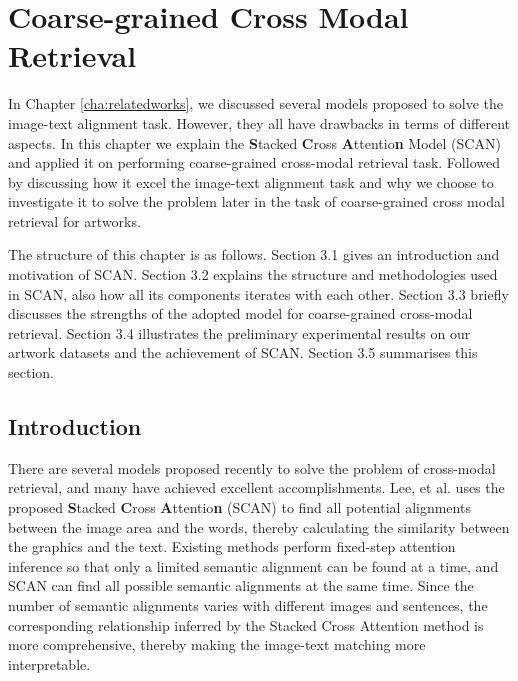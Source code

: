 \chapter{Coarse-grained Cross Modal Retrieval}
\label{cha:scan}
In Chapter \ref{cha:relatedworks}, we discussed several models proposed to solve the image-text alignment task. However, they all have drawbacks in terms of different aspects. In this chapter we explain the \textbf{S}tacked \textbf{C}ross \textbf{A}ttentio\textbf{n} Model (SCAN) \cite{scan} and applied it on performing coarse-grained cross-modal retrieval task. 
Followed by discussing how it excel the image-text alignment task and why we choose to investigate it to solve the problem later in the task of coarse-grained cross modal retrieval for artworks.

The structure of this chapter is as follows. Section 3.1 gives an introduction and motivation of SCAN. Section 3.2 explains the structure and methodologies used in SCAN, also how all its components iterates with each other. Section 3.3 briefly discusses the strengths of the adopted model for coarse-grained cross-modal retrieval. Section 3.4 illustrates the preliminary experimental results on our artwork datasets and the achievement of SCAN. Section 3.5 summarises this section.


\section{Introduction}

There are several models proposed recently to solve the problem of cross-modal retrieval, and many have achieved excellent accomplishments. Lee, et al. \cite{scan} uses the proposed \textbf{S}tacked \textbf{C}ross \textbf{A}ttentio\textbf{n} (SCAN) to find all potential alignments between the image area and the words, thereby calculating the similarity between the graphics and the text. Existing methods perform fixed-step attention inference so that only a limited semantic alignment can be found at a time, and SCAN can find all possible semantic alignments at the same time. Since the number of semantic alignments varies with different images and sentences, the corresponding relationship inferred by the Stacked Cross Attention method is more comprehensive, thereby making the image-text matching more interpretable.

